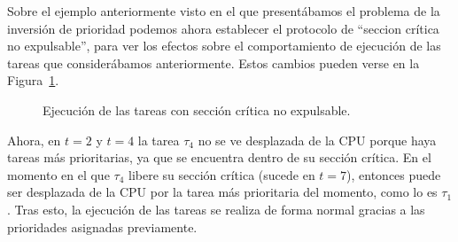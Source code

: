 \begin{ejemplo}
    Sobre el ejemplo anteriormente visto en el que presentábamos el problema de la inversión de prioridad podemos ahora establecer el protocolo de ``seccion crítica no expulsable'', para ver los efectos sobre el comportamiento de ejecución de las tareas que considerábamos anteriormente. Estos cambios pueden verse en la Figura~\ref{fig:sc_no_exp}.
    \begin{figure}[H]
        \centering
        \caption{Ejecución de las tareas con sección crítica no expulsable.}
        \label{fig:sc_no_exp}
    \end{figure}
    Ahora, en $t=2$ y $t=4$ la tarea $\tau_4$ no se ve desplazada de la CPU porque haya tareas más prioritarias, ya que se encuentra dentro de su sección crítica. En el momento en el que $\tau_4$ libere su sección crítica (sucede en $t=7$), entonces puede ser desplazada de la CPU por la tarea más prioritaria del momento, como lo es $\tau_1$. Tras esto, la ejecución de las tareas se realiza de forma normal gracias a las prioridades asignadas previamente.
\end{ejemplo}

